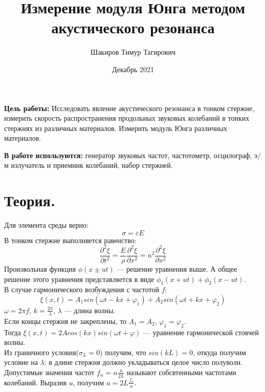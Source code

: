 \documentclass[a4paper, 12pt]{article}
\title{Измерение модуля Юнга методом акустического резонанса}
\author{Шакиров Тимур Тагирович}
\date{Декабрь 2021}
\begin{document}
\maketitle

\textbf{Цель работы:} Исследовать явление акустического резонанса в тонком стержне, измерить скорость распространения продольных звуковых колебаний в тонких стержнях из различных материалов. Измерить модуль Юнга различных материалов.

\vspace{1cm}

\textbf{В работе используются:} генератор звуковых частот, частотометр, осцилограф, э/м излучатель и приемник колебаний, набор стержней.

\vspace{1cm}

\section*{Теория.}
Для элемента среды верно:
\begin{equation}
    \sigma=\varepsilon E
\end{equation}
В тонком стержне выполняется равенство:
\begin{equation}
    \frac{\partial^2\xi}{\partial t^2}=\frac{E}{\rho}\frac{\partial^2\xi}{\partial x^2}=u^2\frac{\partial^2\xi}{\partial x^2}
\end{equation}
Произвольная функция $\phi(x\pm ut)$ --- решение уравнения выше.
А общее решение этого уравнения представляется в виде $\phi_1(x+ut)+\phi_2(x-ut)$.\\
В случае гармонического возбуждения с частотой $f$: 
\begin{equation}
\xi(x,t)=A_1 sin(\omega t-kx+\varphi_1)+A_2 sin(\omega t+kx+\varphi_2)
\end{equation}
$\omega=2\pi f$, $k=\frac{2\pi}{\lambda}$, $\lambda$ --- длина волны.\\
Если концы стержня не закреплены, то $A_1=A_2$, $\varphi_1=\varphi_2$.\\
Тогда $\xi(x,t)=2A cos(kx)sin(\omega t+\varphi)$ --- уравнение гармонической стоячей волны.\\
Из граничного условия($\sigma_L=0$) получим, что $sin(kL)=0$, откуда получим условие на $\lambda$: в длине стержня должно укладываться целое число полуволн. Допустимые значения частот $f_n=n\frac{u}{2L}$ называют собсвтенными частотами колебаний. Выразив $u$, получим $u=2L\frac{f_n}{n}$.
\end{document}
